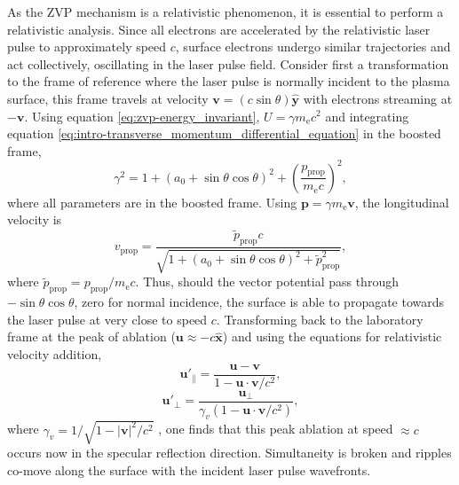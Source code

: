 As the \ac{ZVP} mechanism is a relativistic phenomenon, it is essential to perform a relativistic analysis. Since all electrons are accelerated by the relativistic laser pulse to approximately speed $c$, surface electrons undergo similar trajectories and act collectively, oscillating in the laser pulse field. Consider first a transformation to the frame of reference where the laser pulse is normally incident to the plasma surface, this frame travels at velocity $\mathbf{v} = (c\sin\theta )\hat{\mathbf{y}}$ with electrons streaming at $-\mathbf{v}$. 
Using equation \ref{eq:zvp-energy_invariant}, $U = \gamma m_\mathrm{e} c^2$ and integrating equation \ref{eq:intro-transverse_momentum_differential_equation} in the boosted frame,
\begin{equation}
	\gamma^2 = 1 + (a_0 + \sin\theta\cos\theta)^2 + \left(\frac{p_\mathrm{prop}}{m_\mathrm{e}c}\right)^2,
\end{equation}
where all parameters are in the boosted frame. Using $\mathbf{p} = \gamma m_\mathrm{e} \mathbf{v}$, the longitudinal velocity is
\begin{equation}
	v_\mathrm{prop} = \frac{\tilde{p}_\mathrm{prop}c}{\sqrt{1 + (a_0 + \sin\theta\cos\theta)^2 + \tilde{p}^2_\mathrm{prop}}},
\end{equation}
where $\tilde{p}_\mathrm{prop} = p_\mathrm{prop}/m_\mathrm{e}c$. Thus, should the vector potential pass through $-\sin\theta\cos\theta$, zero for normal incidence, the surface is able to propagate towards the laser pulse at very close to speed $c$. Transforming back to the laboratory frame at the peak of ablation ($\mathbf{u}\approx -c\hat{\mathbf{x}}$) and using the equations for relativistic velocity addition,
\begin{equation}\label{eq:zvp_velocityaddition1}
	\mathbf{u}'_{\|} = \frac{\mathbf{u}-\mathbf{v}}{1- \mathbf{u}\cdot\mathbf{v}/c^2},
\end{equation}
\begin{equation}\label{eq:zvp_velocityaddition2}
	\mathbf{u}'_{\perp} = \frac{\mathbf{u}_\perp}{\gamma_v(1- \mathbf{u}\cdot\mathbf{v}/c^2)},
\end{equation}
where $\gamma_v = 1/\sqrt{1-|\mathbf{v}|^2/c^2}$ \cite{steaneRelativityMadeRelatively2012}, one finds that this peak ablation at speed $\approx c$ occurs now in the specular reflection direction. Simultaneity is broken and ripples co-move along the surface with the incident laser pulse wavefronts.

